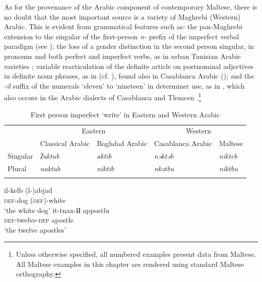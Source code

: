 \documentclass[output=paper]{langsci/langscibook}
\begin{document}
As for the provenance of the Arabic component of contemporary Maltese, there is no doubt that the most important source is a variety of Maghrebi (Western) Arabic. This is evident from grammatical features such as: the pan-Maghrebi extension to the singular of the first-person \textit{n-} prefix of the imperfect verbal paradigm 
(see ); the loss of a gender distinction in the second person singular, in pronouns and both perfect and imperfect verbs, as in urban Tunisian Arabic varieties \citep{Gibson2011}; variable rearticulation of the definite article on postnominal adjectives in definite noun phrases, as in  (cf. \citealt{Gatt2018}), found also in Casablanca Arabic (\citealt[205]{Harrell2004}); and the \textit{-il} suffix of the numerals `eleven' to `nineteen' in determiner use, as in , which also occurs in the Arabic dialects of Casablanca \citep{Caubet2011} and Tlemcen \citep{Taine-Cheikh2011numerals}.\footnote{Unless otherwise specified, all numbered examples present data from Maltese. All Maltese examples in this chapter are rendered using standard Maltese orthography.}

\begin{table}
\caption{First person imperfect `write' in Eastern and Western Arabic}
\label{tab:1:niktib}
 \begin{tabular}{lllll} 
  \lsptoprule
         & \multicolumn{2}{c}{Eastern}       & \multicolumn{2}{c}{Western} \\
         & Classical Arabic & Baghdad Arabic & Casablanca Arabic & Maltese \\
           \midrule
Singular & \textit{ʔaktub}            & \textit{aktib}          & \textit{nəktəb}            & \textit{nikteb}  \\
Plural   & \textit{naktub}           & \textit{niktib}         & \textit{nkətbu}            & \textit{niktbu}  \\
\lspbottomrule
\end{tabular}
\end{table}

\ea\label{ex:optionalarticle}
\gll il-kelb (l-)abjad\\  
     \textsc{def}-dog (\textsc{def})-white\\ 
\glt `the white dog' 
\z
\ea\label{ex:apostles}
\gll it-tnax-\textbf{il} appostlu\\  
     \textsc{def}-twelve-\textsc{dep} apostle\\ 
\glt `the twelve apostles'
\z
\end{document}
